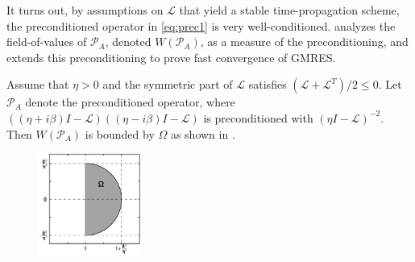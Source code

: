 \documentclass[review]{siamart}
\begin{document}
It turns out, by assumptions on $\mathcal{L}$ that yield a stable time-propagation scheme,
the preconditioned operator in \eqref{eq:prec1} is very well-conditioned. 
 analyzes the field-of-values of $\mathcal{P}_A$, denoted $W(\mathcal{P}_A)$,
as a measure of the preconditioning, and  extends this preconditioning to
prove fast convergence of GMRES. 

%
\begin{theorem}\label{th:fov}
Assume that $\eta > 0$ and the symmetric part of $\mathcal{L}$ satisfies
$(\mathcal{L}+\mathcal{L}^T)/2 \leq 0$. Let $\mathcal{P}_A$ denote the preconditioned
operator, where $((\eta + i\beta)I - \mathcal{L})((\eta - i\beta)I - \mathcal{L})$ is
preconditioned with $(\eta I - \mathcal{L})^{-2}$. Then $W(\mathcal{P}_A)$ is bounded
by $\Omega$ as shown in .
\begin{figure}[h!]
\centering
\includegraphics[width = 0.3\textwidth]{fov.pdf}
\caption{}
\label{fig:bound}
\end{figure}
\end{theorem}
\end{document}
